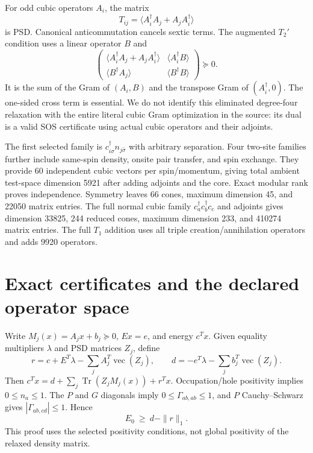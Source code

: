 \documentclass[11pt]{article}
\newcommand{\Tr}{\operatorname{Tr}}
\newcommand{\PSD}{\succeq 0}
\begin{document}
For odd cubic operators $A_i$, the matrix
\begin{equation}
T_{ij}=\langle A_i^\dagger A_j+A_jA_i^\dagger\rangle
\end{equation}
is PSD. Canonical anticommutation cancels sextic terms. The augmented $T_2'$ condition uses a linear operator $B$ and
\begin{equation}
\begin{pmatrix}
\langle A_i^\dagger A_j+A_jA_i^\dagger\rangle&\langle A_i^\dagger B\rangle\\
\langle B^\dagger A_j\rangle&\langle B^\dagger B\rangle
\end{pmatrix}\PSD.
\end{equation}
It is the sum of the Gram of $(A_i,B)$ and the transpose Gram of $(A_i^\dagger,0)$. The one-sided cross term is essential. We do not identify this eliminated degree-four relaxation with the entire literal cubic Gram optimization in the source: its dual is a valid SOS certificate using actual cubic operators and their adjoints.

The first selected family is $c^\dagger_{i\sigma}n_{j\bar\sigma}$ with arbitrary separation. Four two-site families further include same-spin density, onsite pair transfer, and spin exchange. They provide 60 independent cubic vectors per spin/momentum, giving total ambient test-space dimension 5921 after adding adjoints and the core. Exact modular rank proves independence. Symmetry leaves 66 cones, maximum dimension 45, and 22050 matrix entries. The full normal cubic family $c_a^\dagger c_b^\dagger c_c$ and adjoints gives dimension 33825, 244 reduced cones, maximum dimension 233, and 410274 matrix entries. The full $T_1$ addition uses all triple creation/annihilation operators and adds 9920 operators.

\section{Exact certificates and the declared operator space}
Write $M_j(x)=A_jx+b_j\PSD$, $Ex=e$, and energy $c^Tx$. Given equality multipliers $\lambda$ and PSD matrices $Z_j$, define
\begin{equation}
 r=c+E^T\lambda-\sum_j A_j^T\operatorname{vec}(Z_j),\qquad
 d=-e^T\lambda-\sum_j b_j^T\operatorname{vec}(Z_j).
\end{equation}
Then $c^Tx=d+\sum_j\Tr(Z_jM_j(x))+r^Tx$. Occupation/hole positivity implies $0\le n_a\le1$. The $P$ and $G$ diagonals imply $0\le\Gamma_{ab,ab}\le1$, and $P$ Cauchy--Schwarz gives $|\Gamma_{ab,cd}|\le1$. Hence
\begin{equation}\boxed{E_0\ \ge\ d-\|r\|_1.}\end{equation}
This proof uses the selected positivity conditions, not global positivity of the relaxed density matrix.
\end{document}
